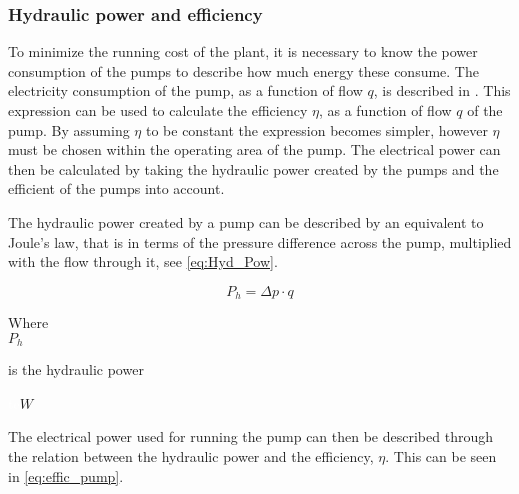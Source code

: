 \subsubsection*{Hydraulic power and efficiency}
\label{pump_power}
To minimize the running cost of the plant, it is necessary to know the power consumption of the pumps to describe how much energy these consume. The electricity consumption of the pump, as a function of flow $q$, is described in \cite{master_aau}. This expression can be used to calculate the efficiency $\eta$, as a function of flow $q$ of the pump. By assuming $\eta$ to be constant the expression becomes simpler, however $\eta$ must be chosen within the operating area of the pump. The electrical power can then be calculated by taking the hydraulic power created by the pumps and the efficient of the pumps into account. 

The hydraulic power created by a pump can be described by an equivalent to Joule's law, that is in terms of the pressure difference across the pump, multiplied with the flow through it, see \eqref{eq:Hyd_Pow}.

\begin{equation}
P_h = \Delta p \cdot q 
\label{eq:Hyd_Pow}
\end{equation}

\begin{minipage}[t]{0.20\textwidth}
Where\\
\hspace*{8mm} $P_h$
\end{minipage}
\begin{minipage}[t]{0.68\textwidth}
\vspace*{2mm}
is the hydraulic power
\end{minipage}
\begin{minipage}[t]{0.10\textwidth}
\vspace*{2mm}
\textcolor{White}{te}$\unit{W}$\\
\end{minipage}	

The electrical power used for running the pump can then be described through the relation between the hydraulic power and the efficiency, $\eta$. This can be seen in \eqref{eq:effic_pump}.

